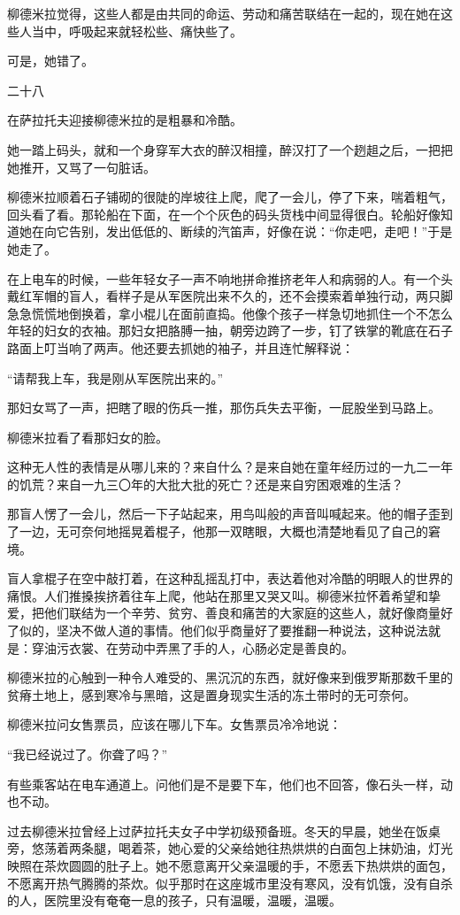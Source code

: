 柳德米拉觉得，这些人都是由共同的命运、劳动和痛苦联结在一起的，现在她在这些人当中，呼吸起来就轻松些、痛快些了。

可是，她错了。

二十八

在萨拉托夫迎接柳德米拉的是粗暴和冷酷。

她一踏上码头，就和一个身穿军大衣的醉汉相撞，醉汉打了一个趔趄之后，一把把她推开，又骂了一句脏话。

柳德米拉顺着石子铺砌的很陡的岸坡往上爬，爬了一会儿，停了下来，喘着粗气，回头看了看。那轮船在下面，在一个个灰色的码头货栈中间显得很白。轮船好像知道她在向它告别，发出低低的、断续的汽笛声，好像在说：“你走吧，走吧！”于是她走了。

在上电车的时候，一些年轻女子一声不响地拼命推挤老年人和病弱的人。有一个头戴红军帽的盲人，看样子是从军医院出来不久的，还不会摸索着单独行动，两只脚急急慌慌地倒换着，拿小棍儿在面前直捣。他像个孩子一样急切地抓住一个不怎么年轻的妇女的衣袖。那妇女把胳膊一抽，朝旁边跨了一步，钉了铁掌的靴底在石子路面上叮当响了两声。他还要去抓她的袖子，并且连忙解释说：

“请帮我上车，我是刚从军医院出来的。”

那妇女骂了一声，把瞎了眼的伤兵一推，那伤兵失去平衡，一屁股坐到马路上。

柳德米拉看了看那妇女的脸。

这种无人性的表情是从哪儿来的？来自什么？是来自她在童年经历过的一九二一年的饥荒？来自一九三〇年的大批大批的死亡？还是来自穷困艰难的生活？

那盲人愣了一会儿，然后一下子站起来，用鸟叫般的声音叫喊起来。他的帽子歪到了一边，无可奈何地摇晃着棍子，他那一双瞎眼，大概也清楚地看见了自己的窘境。

盲人拿棍子在空中敲打着，在这种乱摇乱打中，表达着他对冷酷的明眼人的世界的痛恨。人们推搡挨挤着往车上爬，他站在那里又哭又叫。柳德米拉怀着希望和挚爱，把他们联结为一个辛劳、贫穷、善良和痛苦的大家庭的这些人，就好像商量好了似的，坚决不做人道的事情。他们似乎商量好了要推翻一种说法，这种说法就是：穿油污衣裳、在劳动中弄黑了手的人，心肠必定是善良的。

柳德米拉的心触到一种令人难受的、黑沉沉的东西，就好像来到俄罗斯那数千里的贫瘠土地上，感到寒冷与黑暗，这是置身现实生活的冻土带时的无可奈何。

柳德米拉问女售票员，应该在哪儿下车。女售票员冷冷地说：

“我已经说过了。你聋了吗？”

有些乘客站在电车通道上。问他们是不是要下车，他们也不回答，像石头一样，动也不动。

过去柳德米拉曾经上过萨拉托夫女子中学初级预备班。冬天的早晨，她坐在饭桌旁，悠荡着两条腿，喝着茶，她心爱的父亲给她往热烘烘的白面包上抹奶油，灯光映照在茶炊圆圆的肚子上。她不愿意离开父亲温暖的手，不愿丢下热烘烘的面包，不愿离开热气腾腾的茶炊。似乎那时在这座城市里没有寒风，没有饥饿，没有自杀的人，医院里没有奄奄一息的孩子，只有温暖，温暖，温暖。

